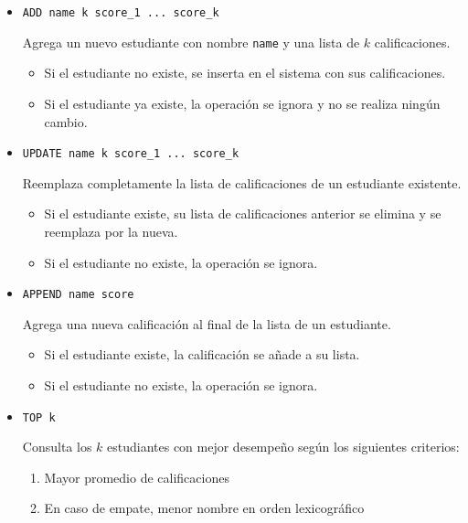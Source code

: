 \documentclass[11pt,a4paper]{article}
\begin{document}
\begin{itemize}

\item \texttt{ADD name k score\_1 ... score\_k}

Agrega un nuevo estudiante con nombre \texttt{name} y una lista de $k$ calificaciones.

\begin{itemize}
    \item Si el estudiante no existe, se inserta en el sistema con sus calificaciones.
    \item Si el estudiante ya existe, la operación se ignora y no se realiza ningún cambio.
\end{itemize}

\vspace{0.3cm}

\item \texttt{UPDATE name k score\_1 ... score\_k}

Reemplaza completamente la lista de calificaciones de un estudiante existente.

\begin{itemize}
    \item Si el estudiante existe, su lista de calificaciones anterior se elimina y se reemplaza por la nueva.
    \item Si el estudiante no existe, la operación se ignora.
\end{itemize}

\vspace{0.3cm}

\item \texttt{APPEND name score}

Agrega una nueva calificación al final de la lista de un estudiante.

\begin{itemize}
    \item Si el estudiante existe, la calificación se añade a su lista.
    \item Si el estudiante no existe, la operación se ignora.
\end{itemize}

\vspace{0.3cm}

\item \texttt{TOP k}

Consulta los $k$ estudiantes con mejor desempeño según los siguientes criterios:

\begin{enumerate}
    \item Mayor promedio de calificaciones
    \item En caso de empate, menor nombre en orden lexicográfico
\end{enumerate}


\end{itemize}
\end{document}
